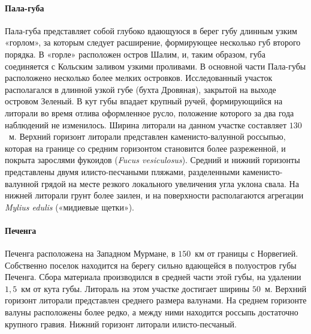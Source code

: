     \paragraph{Пала-губа}
Пала-губа   представляет   собой   глубоко   вдающуюся   в   берег   губу   длинным   узким «горлом», за которым следует расширение, формирующее несколько губ второго порядка. 
В «горле» расположен остров Шалим, и, таким образом, губа соединяется с Кольским заливом узкими   проливами.   
В   основной   части   Пала-губы   расположено   несколько   более   мелких островков. 
Исследованный участок располагался в длинной узкой губе (бухта Дровяная), закрытой на выходе островом Зеленый.
В кут губы впадает крупный ручей, формирующийся на литорали во время отлива оформленное русло, положение которого за два года наблюдений не изменилось.
Ширина литорали на данном участке составляет  $130$~м. 
Верхний горизонт литорали представлен   каменисто-валунной   россыпью,   которая   на   границе   со   средним   горизонтом становится более разреженной, и покрыта зарослями фукоидов ({\it Fucus vesiculosus}). 
Средний и нижний   горизонты   представлены   двумя   илисто-песчаными   пляжами,   разделенными каменисто-валунной грядой на месте резкого локального увеличения угла уклона свала. 
На нижней литорали грунт более заилен, и на поверхности располагаются агрегации {\it Mylius edulis} («мидиевые щетки»).

    \paragraph{Печенга}
Печенга расположена на Западном Мурмане, в $150$~км от границы с Норвегией. 
Собственно поселок находится на берегу сильно вдающейся в полуостров губы Печенга. 
Сбора материала производился в средней части этой губы, на удалении $1,5$~км от кута губы. 
Литораль на этом участке достигает ширины $50$~м. 
Верхний горизонт литорали представлен среднего размера валунами. 
На среднем горизонте валуны расположены более редко, а между ними находится россыпь достаточно крупного гравия. 
Нижний горизонт литорали илисто-песчаный. 

